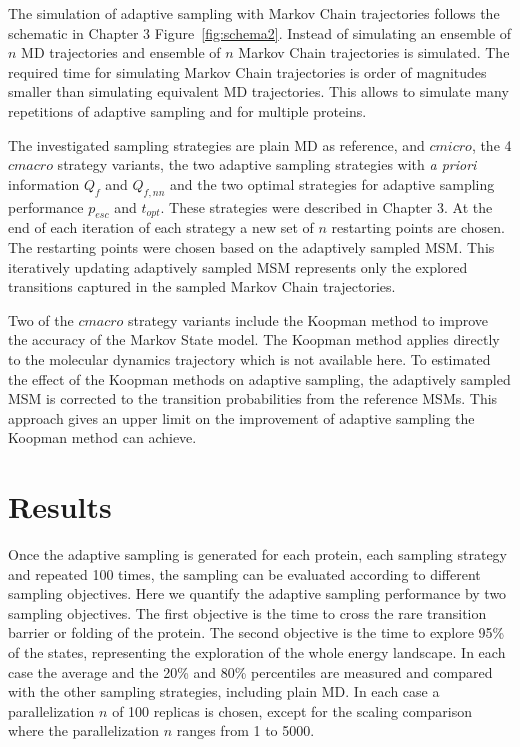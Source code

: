The simulation of adaptive sampling with Markov Chain trajectories follows the schematic in Chapter 3 Figure~\ref{fig:schema2}. 
Instead of simulating an ensemble of $n$ MD trajectories and ensemble of $n$ Markov Chain trajectories is simulated. The required time for simulating Markov Chain trajectories is order of magnitudes smaller than simulating equivalent MD trajectories. This allows to simulate many repetitions of adaptive sampling and for multiple proteins.

The investigated sampling strategies are plain MD as reference, and $cmicro$, the 4 $cmacro$ strategy variants, the two adaptive sampling strategies with \emph{a priori} information $Q_{f}$ and $Q_{f,nn}$ and the two optimal strategies for adaptive sampling performance $p_{esc}$ and $t_{opt}$.  These strategies were described in Chapter 3.
At the end of each iteration of each strategy a new set of $n$ restarting points are chosen. The restarting points were chosen based on the adaptively sampled MSM. This iteratively updating adaptively sampled MSM represents only the explored transitions captured in the sampled Markov Chain trajectories. 

Two of the $cmacro$ strategy variants include the Koopman method to improve the accuracy of the Markov State model. The Koopman method applies directly to the molecular dynamics trajectory which is not available here. To estimated the effect of the Koopman methods on adaptive sampling, the adaptively sampled MSM is corrected to the transition probabilities from the reference MSMs. This approach gives an upper limit on the improvement of adaptive sampling the Koopman method can achieve. 


\section{\label{sec:results}Results}

Once the adaptive sampling is generated for each protein, each sampling strategy and repeated 100 times, the sampling can be evaluated according to different sampling objectives.
Here we quantify the adaptive sampling performance by two sampling objectives. The first objective is the time to cross the rare transition barrier or folding of the protein. The second objective is the time to explore 95\% of the states, representing the exploration of the whole energy landscape.
In each case the average and the 20\% and 80\% percentiles are measured and compared with the other sampling strategies, including plain MD.  
In each case a parallelization $n$ of 100 replicas is chosen, except for the scaling comparison where the parallelization $n$ ranges from 1 to 5000. 

